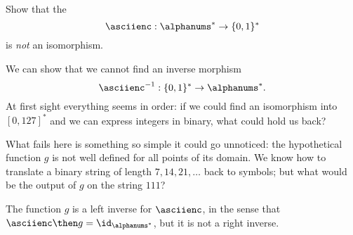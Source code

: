 \begin{exercise}
    Show that the \whomo
    \begin{equation*}
        \label{eq:ascii-to-bin}
        \asciienc: \alphanums^* \to \{0,1\}^*
    \end{equation*}
    is \emph{not} an isomorphism.
\end{exercise}
\begin{solution}
    We can show that we cannot find an inverse morphism
    \begin{equation}
        \label{eq:bin-to-ascii}
        \asciienc^{-1}:  \{0,1\}^* \to \alphanums^*.
    \end{equation}
    At first sight everything seems in order: if we could find an isomorphism into $[0,127]^*$ and we can express integers in binary, what could hold us back?
    
    What fails here is something so simple it could go unnoticed: the hypothetical function $g$ is not well defined for all points of its domain.
    We know how to translate a binary string of length $7,14,21,\dots$ back to symbols; but what would be the output of $g$ on the string $111$?
    
    The function $g$ is a left inverse for $\asciienc$, in the sense that
    $\asciienc\then g = \id_{\alphanums^*}$, but it is not a right inverse.
    
\end{solution}


